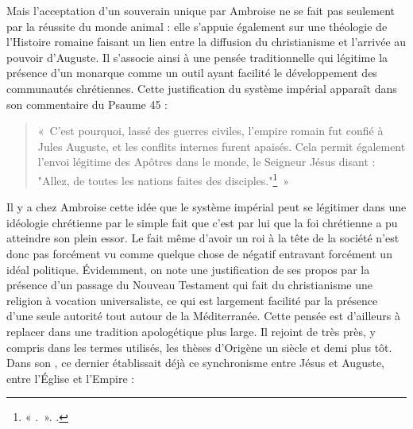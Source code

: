 \bigskip

Mais l'acceptation d'un souverain unique par Ambroise ne se fait pas seulement par la réussite du monde animal : elle s'appuie également sur une théologie de l'Histoire romaine faisant un lien entre la diffusion du christianisme et l'arrivée au pouvoir d'Auguste. Il s'associe ainsi à une pensée traditionnelle qui légitime la présence d'un monarque comme un outil ayant facilité le développement des communautés chrétiennes. Cette justification du système impérial apparaît dans son commentaire du Psaume 45 :

\bigskip

\begin{quote}
    «~C’est pourquoi, lassé des guerres civiles, l’empire romain fut confié à Jules Auguste, et les conflits internes furent apaisés. Cela permit également l’envoi légitime des Apôtres dans le monde, le Seigneur Jésus disant : "Allez, de toutes les nations faites des disciples."\footnote{« .~». \cite[, 21]{ambroise_csel_64}.}~»
\end{quote}

\bigskip

Il y a chez Ambroise cette idée que le système impérial peut se légitimer dans une idéologie chrétienne par le simple fait que c'est par lui que la foi chrétienne a pu atteindre son plein essor. Le fait même d'avoir un roi à la tête de la société n'est donc pas forcément vu comme quelque chose de négatif entravant forcément un idéal politique. Évidemment, on note une justification de ses propos par la présence d'un passage du Nouveau Testament qui fait du christianisme une religion à vocation universaliste, ce qui est largement facilité par la présence d'une seule autorité tout autour de la Méditerranée. Cette pensée est d'ailleurs à replacer dans une tradition apologétique plus large. Il rejoint de très près, y compris dans les termes utilisés, les thèses d'Origène un siècle et demi plus tôt. Dans son , ce dernier établissait déjà ce synchronisme entre Jésus et Auguste, entre l'Église et l'Empire :

